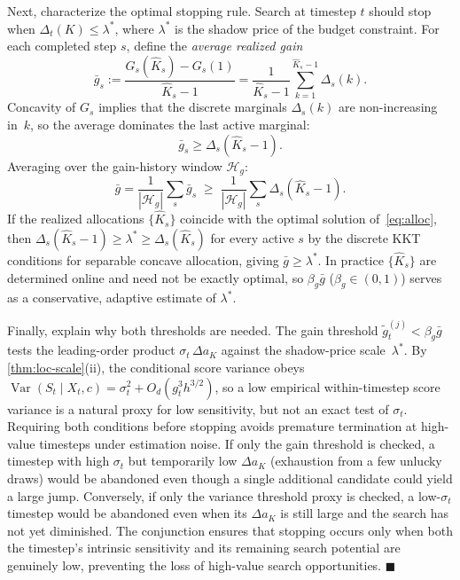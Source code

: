 Next, characterize the optimal stopping rule.
Search at timestep $t$ should stop when $\Delta_t(K)\le\lambda^*$, where
$\lambda^*$ is the shadow price of the budget constraint.
For each completed step $s$, define the \emph{average realized gain}
\[
  \bar{g}_s
  := \frac{G_s(\hat{K}_s)-G_s(1)}{\hat{K}_s - 1}
  = \frac{1}{\hat{K}_s-1}
    \sum_{k=1}^{\hat{K}_s-1}\Delta_s(k).
\]
Concavity of $G_s$ implies that the discrete marginals
$\Delta_s(k)$ are non-increasing in~$k$, so the average dominates the
last active marginal:
\[
  \bar{g}_s
  \ge \Delta_s(\hat{K}_s-1).
\]
Averaging over the gain-history window $\mathcal{H}_g$:
\[
  \bar{g}
  =\frac{1}{|\mathcal{H}_g|}\sum_s\bar{g}_s
  \;\ge\;
  \frac{1}{|\mathcal{H}_g|}\sum_s \Delta_s(\hat{K}_s-1).
\]
If the realized allocations $\{\hat{K}_s\}$ coincide with the optimal
solution of~\eqref{eq:alloc}, then
$\Delta_s(\hat{K}_s-1)\ge\lambda^*\ge \Delta_s(\hat{K}_s)$ for every
active $s$ by the discrete KKT conditions for separable concave
allocation, giving $\bar{g}\ge\lambda^*$.
In practice $\{\hat{K}_s\}$ are determined online and need not be
exactly optimal, so $\beta_g\bar{g}$ ($\beta_g\in(0,1)$) serves as a
conservative, adaptive estimate of $\lambda^*$.

Finally, explain why both thresholds are needed.
The gain threshold $\widetilde{g}_t^{(j)}<\beta_g\bar{g}$ tests the
leading-order product $\sigma_t\,\Delta a_K$ against the
shadow-price scale~$\lambda^*$.
By \cref{thm:loc-scale}(ii), the conditional score variance obeys
$\operatorname{Var}(S_t\mid X_t,c)=\sigma_t^2+O_d(g_t^3 h^{3/2})$, so a
low empirical within-timestep score variance is a natural proxy for low
sensitivity, but not an exact test of $\sigma_t$.
Requiring both conditions before stopping avoids
premature termination at high-value timesteps under estimation noise.
If only the gain threshold is checked, a timestep with high
$\sigma_t$ but temporarily low $\Delta a_K$ (exhaustion from a few
unlucky draws) would be abandoned even though a single additional
candidate could yield a large jump.
Conversely, if only the variance threshold proxy is checked, a low-$\sigma_t$
timestep would be abandoned even when its $\Delta a_K$ is still large and
the search has not yet diminished.
The conjunction ensures that stopping occurs only when both the
timestep's intrinsic sensitivity and its remaining search potential
are genuinely low, preventing the loss of high-value search
opportunities.
\hfill$\blacksquare$
